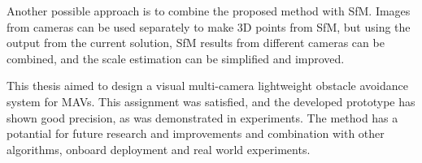 Another possible approach is to combine the proposed method with SfM.
Images from cameras can be used separately to make 3D points from SfM, but using the output from the current solution, SfM results from different cameras can be combined, and the scale estimation can be simplified and improved.

This thesis aimed to design a visual multi-camera lightweight obstacle avoidance system for MAVs. 
This assignment was satisfied, and the developed prototype has shown good precision, as was demonstrated in experiments.
The method has a potantial for future research and improvements and combination with other algorithms, onboard deployment and real world experiments.